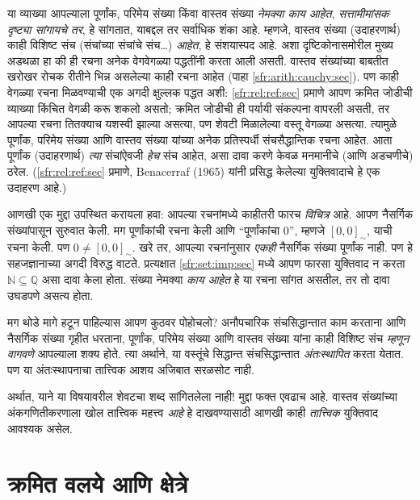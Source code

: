 \documentclass[11pt,a4paper,openany]{book}
\theoremstyle{definition}
\newcommand{\Nat}{\mathbb{N}}
\newcommand{\Rat}{\mathbb{Q}}
\newcommand{\equivrep}[2]{[#1]_{#2}}
\newcommand{\Intequiv}{\sim}
\begin{document}
या व्याख्या आपल्याला पूर्णांक, परिमेय संख्या किंवा वास्तव संख्या
\emph{नेमक्या काय आहेत}, \emph{सत्तामीमांसक दृष्ट्या सांगायचे तर}, हे
सांगतात, याबद्दल तर
सर्वाधिक शंका आहे. म्हणजे, वास्तव संख्या (उदाहरणार्थ) काही विशिष्ट संच
(संचांच्या संचांचे संच\ldots) \emph{आहेत}, हे संशयास्पद आहे. अशा
दृष्टिकोनासमोरील मुख्य अडथळा हा की ही रचना अनेक वेगवेगळ्या पद्धतींनी करता
आली असती. वास्तव संख्यांच्या बाबतीत खरोखर रोचक रीतीने भिन्न असलेल्या काही
रचना आहेत (पाहा \ref{sfr:arith:cauchy:sec}). पण काही वेगळ्या रचना मिळवण्याची
एक अगदी क्षुल्लक पद्धत अशी: \ref{sfr:rel:ref:sec} प्रमाणे आपण
क्रमित जोडीची व्याख्या किंचित वेगळी करू शकलो असतो; क्रमित जोडीची ही
पर्यायी संकल्पना वापरली असती, तर आपल्या रचना तितक्याच यशस्वी झाल्या
असत्या, पण शेवटी मिळालेल्या वस्तू वेगळ्या असत्या. त्यामुळे पूर्णांक,
परिमेय संख्या आणि वास्तव संख्या यांच्या अनेक प्रतिस्पर्धी संचसैद्धान्तिक
रचना आहेत. आता पूर्णांक (उदाहरणार्थ) \emph{त्या} संचांऐवजी \emph{हेच}
संच आहेत, असा दावा करणे केवळ मनमानीचे (आणि अडचणीचे) ठरेल.
(\ref{sfr:rel:ref:sec} प्रमाणे, Benacerraf (1965) यांनी
प्रसिद्ध केलेल्या युक्तिवादाचे हे एक उदाहरण आहे.)

आणखी एक मुद्दा उपस्थित करायला हवा: आपल्या रचनांमध्ये काहीतरी फारच
\emph{विचित्र} आहे. आपण नैसर्गिक संख्यांपासून सुरुवात केली. मग पूर्णांकांची
रचना केली आणि ``पूर्णांकांचा $0$'', म्हणजे $ \equivrep{0,0}{\Intequiv}$,
याची रचना केली. पण $0 \neq \equivrep{0,0}{\Intequiv}$. खरे तर, आपल्या
रचनांनुसार \emph{एकही} नैसर्गिक संख्या पूर्णांक नाही. पण हे सहजज्ञानाच्या
अगदी विरुद्ध वाटते. प्रत्यक्षात \ref{sfr:set:imp:sec} मध्ये आपण
फारसा युक्तिवाद न करता $\Nat \subseteq \Rat$ असा दावा केला होता. संख्या
नेमक्या \emph{काय आहेत} हे या रचना सांगत असतील, तर तो दावा उघडपणे असत्य
होता.

मग थोडे मागे हटून पाहिल्यास आपण कुठवर पोहोचलो? अनौपचारिक संचसिद्धान्तात
काम करताना आणि नैसर्गिक संख्या गृहीत धरताना, पूर्णांक, परिमेय संख्या आणि
वास्तव संख्या यांना काही विशिष्ट संच \emph{म्हणून वागवणे} आपल्याला शक्य
होते. त्या अर्थाने, या वस्तूंचे सिद्धान्त संचसिद्धान्तात
\emph{अंतःस्थापित} करता येतात. पण या अंतःस्थापनाचा तात्त्विक आशय अजिबात
सरळसोट नाही.

अर्थात, याने या विषयावरील शेवटचा शब्द सांगितलेला नाही!{} मुद्दा फक्त
एवढाच आहे. वास्तव संख्यांच्या अंकगणितीकरणाला खोल तात्त्विक महत्त्व
\emph{आहे} हे दाखवण्यासाठी आणखी काही \emph{तात्त्विक} युक्तिवाद आवश्यक असेल.









\section{क्रमित वलये आणि क्षेत्रे}\label{sfr:arith:check:sec}
\end{document}
